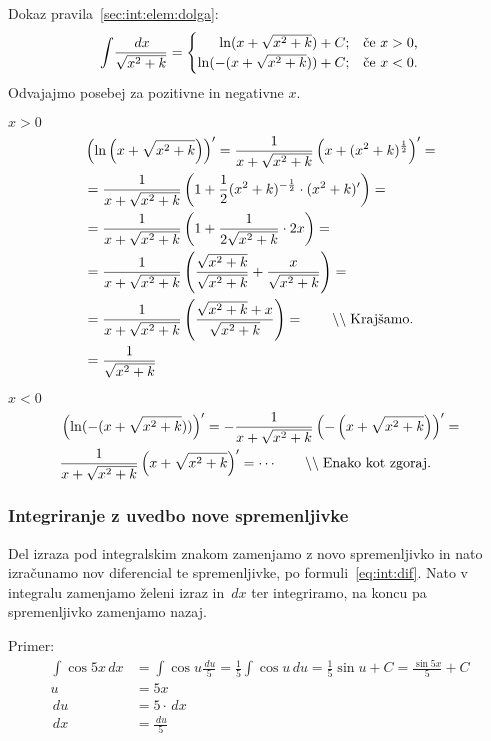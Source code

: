 \documentclass[a4paper,oneside,12pt,fleqn]{article}
\newcommand\krat\cdot
\newcommand{\comment}[1]{\ensuremath{\qquad\backslash\backslash\;}\textnormal{#1}}
\def\kos{\cos}
\renewcommand{\d}{\ensuremath{\,d}} %
\newcommand{\dx}{\ensuremath{\d x}}
\newcommand{\du}{\ensuremath{\d u}}
\numberwithin{equation}{section}
\newenvironment{enumerate*}%
{
\vspace{-12pt}%
\begin{enumerate}%
\setlength{\itemsep}{0pt}%
\setlength{\parskip}{2pt}}%
{\end{enumerate}}
\begin{document}
Dokaz pravila~\eqref{sec:int:elem:dolga}: \\
\[ \int\!\frac{\dx}{\sqrt{x^2+k}} =
\begin{cases}
  \hfill \ln(x+\sqrt{x^2+k}) + C; & \text{če $x > 0$,} \\
  \hfill \ln(-(x+\sqrt{x^2+k})) + C; & \text{če $x < 0$.}
\end{cases} \]
Odvajajmo posebej za pozitivne in negativne $x$.
\begin{enumerate*}
  \item $x > 0$
    \begin{align*}
      & \left( \ln \left(x + \sqrt{x^2 + k}\right)\right)' =
          \frac{1}{x + \sqrt{x^2 + k}} \left( x+(x^2+k)^{\frac{1}{2}} \right)' = \\
      & = \frac{1}{x + \sqrt{x^2 + k}} \left( 1 + \frac{1}{2}(x^2 + k)^{-\frac{1}{2}} \krat (x^2 + k)' \right) = \\
      & = \frac{1}{x + \sqrt{x^2 + k}} \left( 1 + \frac{1}{2\sqrt{x^2 + k}}\krat 2x \right) = \\
      & = \frac{1}{x + \sqrt{x^2 + k}} \left( \frac{\sqrt{x^2+k}}{\sqrt{x^2+k}} + \frac{x}{\sqrt{x^2 + k}} \right) = \\
      & = \frac{1}{x + \sqrt{x^2 + k}} \left( \frac{\sqrt{x^2 + k} + x}{\sqrt{x^2+k}} \right) = \comment{Krajšamo.} \\
      & = \frac{1}{\sqrt{x^2 + k}}
    \end{align*}
  \item $x < 0$
    \begin{align*}
      & \left( \ln(-(x+\sqrt{x^2+k}))\right)' =
      -\frac{1}{x+\sqrt{x^2+k}}\left( -\left( x+\sqrt{x^2+k} \right)\right)' = \\
      & \frac{1}{x+\sqrt{x^2+k}}\left(x+\sqrt{x^2+k} \right)' = \cdots \comment{Enako kot zgoraj.}
    \end{align*}
\end{enumerate*}

\subsubsection{Integriranje z uvedbo nove spremenljivke}
\label{sec:int:subst}
Del izraza pod integralskim znakom zamenjamo z novo spremenljivko in nato izračunamo nov
diferencial te spremenljivke, po formuli~\eqref{eq:int:dif}. Nato v integralu zamenjamo
želeni izraz in $\!\dx$ ter integriramo, na koncu pa spremenljivko zamenjamo nazaj.

Primer:
\begin{align*}
  \int\!\kos5x\dx &= \int\!\kos u\frac{\du}{5} = \frac{1}{5}\!\int\!\kos u \du =
  \frac{1}{5} \sin u + C = \frac{\sin 5x}{5} + C \\
  u &= 5x \\
  \du &= 5\krat \dx \\
  \dx &= \frac{\du}{5}
\end{align*}
\end{document}
